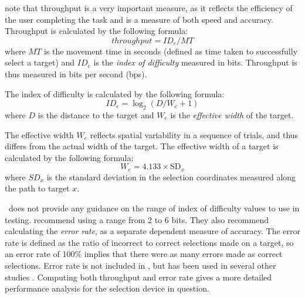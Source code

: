 \documentclass{elsart}
\begin{document}
\citet{Mack-IS-2001-EHCI} note that throughput
is a very important measure, as it reflects the efficiency of the user
completing the task and is a measure of both speed and
accuracy. Throughput is calculated by the following formula:
\begin{equation}
	\label{eqn-throughput}
	\mathit{throughput} = \mathit{ID}_{e} / \mathit{MT}
\end{equation}
where \(\mathit{MT}\) is the movement time in seconds (defined as time
taken to successfully select a target) and \(\mathit{ID}_{e}\) is the
\emph{index of difficulty} measured in bits. Throughput is thus measured
in bits per second (bps).

The index of difficulty is calculated by the following formula:
\begin{equation}
	\label{eqn-IDe}
	\mathit{ID}_{e} = \log_{2}(D / W_{e} + 1)
\end{equation}
where \(D\) is the distance to the target and \(W_{e}\) is the
\emph{effective width} of the target.

The effective width \(W_{e}\) reflects spatial variability in a sequence
of trials, and thus differs from the actual width of the target. The
effective width of a target is calculated by the following formula:
\begin{equation}
	\label{eqn-We}
	W_{e} = 4.133 \times \mathrm{SD}_{x}
\end{equation}
where \(\mathit{SD}_{x}\) is the standard deviation in the selection
coordinates measured along the path to target \(x\).

\ISOnine\ does not provide any guidance on the range of index of
difficulty values to use in testing. \citet{Doug-SA-1999-CHI} recommend
using a range from 2 to 6 bits. They also recommend calculating the
\emph{error rate}, as a separate dependent measure of accuracy. The
error rate is defined as the ratio of incorrect to correct selections
made on a target, so an error rate of 100\% implies that there were as
many errors made as correct selections. Error rate is not included in
\ISOnine, but has been used in several other studies
\citep{Sear-A-1991-IJMMS,Sear-A-1993-BIT,Hara-H-1996,Bend-G-1999-PhD,
Doug-SA-1999-CHI,Mack-IS-2001-EHCI,Po-BA-2004-CHI}. Computing both
throughput and error rate gives a more detailed performance analysis for
the selection device in question.


%
\end{document}
